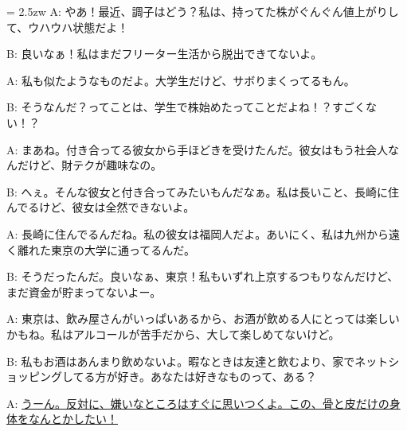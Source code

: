 \documentclass[11pt]{amsart}
\title{}
\author{}
\newenvironment{hangall}[1]{\hangindent = 2.5zw\everypar{\hangindent = 2.5zw}}{}
\begin{document}
\maketitle
\begin{hangall}{}%
A: やあ！最近、調子はどう？私は、持ってた株がぐんぐん値上がりして、ウハウハ状態だよ！

B: 良いなぁ！私はまだフリーター生活から脱出できてないよ。

A: 私も似たようなものだよ。大学生だけど、サボりまくってるもん。

B: そうなんだ？ってことは、学生で株始めたってことだよね！？すごくない！？

A: まあね。付き合ってる彼女から手ほどきを受けたんだ。彼女はもう社会人なんだけど、財テクが趣味なの。

B: へぇ。そんな彼女と付き合ってみたいもんだなぁ。私は長いこと、長崎に住んでるけど、彼女は全然できないよ。

A: 長崎に住んでるんだね。私の彼女は福岡人だよ。あいにく、私は九州から遠く離れた東京の大学に通ってるんだ。

B: そうだったんだ。良いなぁ、東京！私もいずれ上京するつもりなんだけど、まだ資金が貯まってないよー。

A: 東京は、飲み屋さんがいっぱいあるから、お酒が飲める人にとっては楽しいかもね。私はアルコールが苦手だから、大して楽しめてないけど。

B: 私もお酒はあんまり飲めないよ。暇なときは友達と飲むより、家でネットショッピングしてる方が好き。あなたは好きなものって、ある？

A: \ul{うーん。反対に、嫌いなところはすぐに思いつくよ。この、骨と皮だけの身体をなんとかしたい！}\end{hangall}
\end{document}
